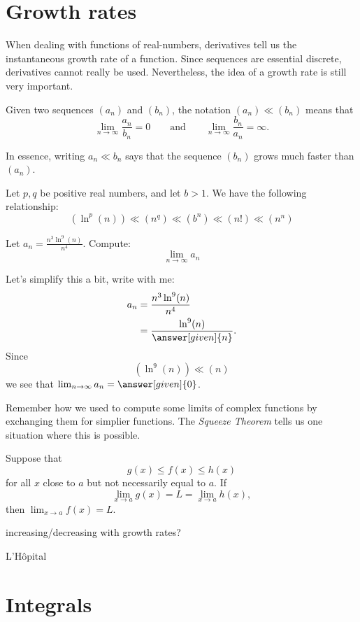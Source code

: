 \documentclass{ximera}
\begin{document}
\section{Growth rates}

When dealing with functions of real-numbers, derivatives tell us the
instantaneous growth rate of a function. Since sequences are essential
discrete, derivatives cannot really be used. Nevertheless, the idea of
a growth rate is still very important.

\begin{definition}
  Given two sequences $(a_n)$ and $(b_n)$, the notation $(a_n) \ll
  (b_n)$ means that
  \[
  \lim_{n\to\infty} \frac{a_n}{b_n} =
  0\qquad\text{and}\qquad\lim_{n\to\infty} \frac{b_n}{a_n} =\infty.
  \]
\end{definition}

In essence, writing $a_n \ll b_n$ says that the sequence $(b_n)$ grows
much faster than $(a_n)$.


\begin{theorem}
  Let $p,q$ be positive real numbers, and let $b> 1$. We have the
  following relationship:
  \[
  (\ln^p(n))\ll (n^q) \ll (b^n) \ll (n!) \ll (n^n)
  \]
\end{theorem}

\begin{example}
  Let $a_n  = \frac{n^3\ln^{9}(n)}{n^4}$. Compute:
  \[
  \lim_{n\to \infty}a_n
  \]
  \begin{explanation}
    Let's simplify this a bit, write with me:
    \begin{align*}
      a_n &= \frac{n^3\ln^{9}(n)}{n^4}\\
      &= \frac{\ln^{9}(n)}{\answer[given]{n}}.
    \end{align*}
    Since
    \[
    (\ln^{9}(n))\ll (n)
    \]
    we see that $\lim_{n\to\infty}a_n =\answer[given]{0}$.
  \end{explanation}
\end{example}


Remember how we used to compute some limits of complex functions by
exchanging them for simplier functions. The \textit{Squeeze Theorem}
tells us one situation where this is possible.

\begin{theorem}
  Suppose that
  \[
  g(x) \le f(x) \le h(x)
  \]
  for all $x$ close to $a$ but not necessarily equal to $a$. If
  \[
  \lim_{x\to a} g(x) = L = \lim_{x\to a} h(x),
  \] 
  then $\lim_{x\to a} f(x) = L$.
\end{theorem}


increasing/decreasing with growth rates?



L'H\^opital


\section{Integrals}
\end{document}
